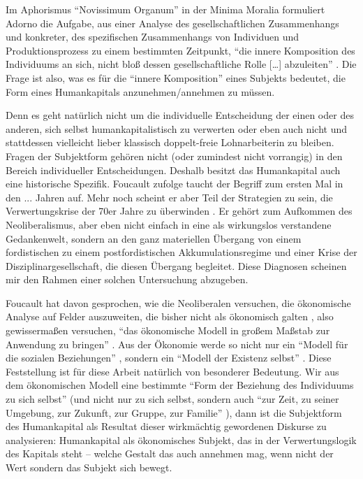 \documentclass[12pt,
               DIV13,
               paper=a4,
               twoside=false,
               onehalfspacing,
               bibliography=totoc,
               toc=graduated,
               draft,
               ]{scrartcl}
\newcommand{\lips}{\dots\unkern}
\newcommand{\pc}[2]{\parencite[#1]{#2}}
\newcommand{\vgl}[2]{\parencite[vgl.][#1]{#2}}
\newcommand{\worries}[1]{\ifdraft{\textcolor{blue}{\texttt{(#1)}}}{}}
\begin{document}
Im Aphorismus "`Novissimum Organum"' in der Minima Moralia formuliert
Adorno die Aufgabe, aus einer Analyse des gesellschaftlichen
Zusammenhangs und konkreter, des spezifischen Zusammenhangs von
Individuen und Produktionsprozess zu einem bestimmten Zeitpunkt, "`die
innere Komposition des Individuums an sich, nicht bloß dessen
gesellschaftliche Rolle [\lips] abzuleiten"' \pc{261}{min}. Die Frage
ist also, was es für die "`innere Komposition"' eines Subjekts
bedeutet, die Form eines Humankapitals anzunehmen/annehmen zu müssen.

Denn es geht natürlich nicht um die individuelle Entscheidung der
einen oder des anderen, sich selbst humankapitalistisch zu verwerten
oder eben auch nicht und stattdessen vielleicht lieber klassisch
doppelt-freie Lohnarbeiterin zu bleiben. Fragen der Subjektform
gehören nicht (oder zumindest nicht vorrangig) in den Bereich
individueller Entscheidungen. Deshalb besitzt das Humankapital auch
eine historische Spezifik. Foucault zufolge taucht der Begriff zum
ersten Mal in den ... Jahren \worries{?} auf. Mehr noch scheint er
aber Teil der Strategien zu sein, die Verwertungskrise der 70er Jahre
zu überwinden \worries{?} \vgl{xx}{gbp}. Er gehört zum Aufkommen des
Neoliberalismus, aber eben nicht einfach in eine als wirkungslos
verstandene Gedankenwelt, sondern an den ganz materiellen Übergang von
einem fordistischen zu einem postfordistischen Akkumulationsregime und
einer Krise der Disziplinargesellschaft, die diesen Übergang
begleitet. Diese Diagnosen scheinen mir den Rahmen einer solchen
\worries{?} Untersuchung abzugeben.

Foucault hat davon gesprochen, wie die Neoliberalen versuchen, die
ökonomische Analyse auf Felder auszuweiten, die bisher nicht als
ökonomisch galten \vgl{305}{gbp}, also gewissermaßen versuchen, "`das
ökonomische Modell in großem Maßstab zur Anwendung zu bringen"'
\pc{334}{gbp}. Aus der Ökonomie werde so nicht nur ein "`Modell für
die sozialen Beziehungen"' \pc{334}{gbp}, sondern ein "`Modell der
Existenz selbst"' \pc{334}{gbp}. Diese Feststellung ist für diese
Arbeit natürlich von besonderer Bedeutung. Wir aus dem ökonomischen
Modell eine bestimmte "`Form der Beziehung des Individuums zu sich
selbst"' \pc{334}{gbp} (und nicht nur zu sich selbst, sondern auch
"`zur Zeit, zu seiner Umgebung, zur Zukunft, zur Gruppe, zur Familie"'
\pc{334}{gbp}), dann ist die Subjektform des Humankapital als Resultat
dieser wirkmächtig gewordenen Diskurse zu analysieren: Humankapital
als ökonomisches Subjekt, das in der Verwertungslogik des Kapitals
steht -- welche Gestalt das auch annehmen mag, wenn nicht der Wert
sondern das Subjekt sich bewegt.
\end{document}

